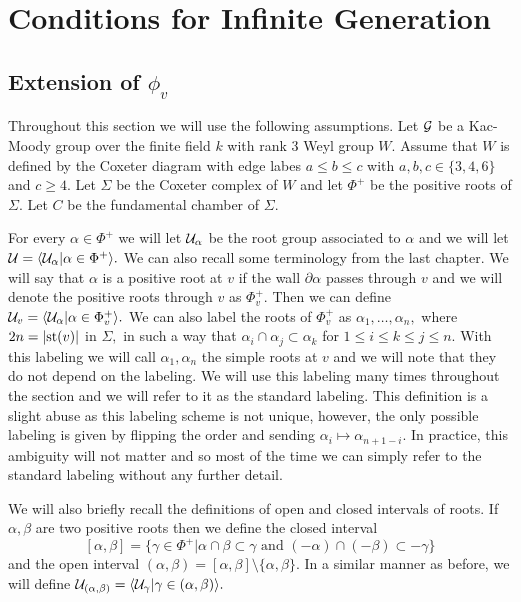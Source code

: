 \documentclass[class=book, crop=false,12 pt]{standalone}
\begin{document}
\chapter{Conditions for Infinite Generation}
\section{Extension of $\phi_v$}
Throughout this section we will use the following assumptions. Let $\mathcal{G}$ be a Kac-Moody group over the finite field $k$ with rank 3 Weyl group $W.$ Assume that $W$ is defined by the Coxeter diagram with edge labes $a\le b\le c$ with $a,b,c\in \{3,4,6\}$ and $c\ge 4.$ Let $\Sigma$ be the Coxeter complex of $W$ and let $\Phi^+$ be the positive roots of $\Sigma.$ Let $C$ be the fundamental chamber of $\Sigma.$

For every $\alpha\in \Phi^+$ we will let $\mathcal{U}_\alpha$ be the root group associated to $\alpha$ and we will let $\mathcal{U}=\langle\mathcal{U}_\alpha|\alpha\in \Phi^+\rangle.$ We can also recall some terminology from the last chapter. We will say that $\alpha$ is a positive root at $v$ if the wall $\partial\alpha$ passes through $v$ and we will denote the positive roots through $v$ as $\Phi_v^+.$ Then we can define $\mathcal{U}_v=\langle \mathcal{U}_\alpha|\alpha\in \Phi_v^+\rangle.$ We can also label the roots of $\Phi_v^+$ as $\alpha_1,\dots,\alpha_n,$ where $2n=|\mathrm{st}(v)|$ in $\Sigma,$ in such a way that $\alpha_i\cap \alpha_j\subset \alpha_k$ for $1\le i\le k\le j\le n.$ With this labeling we will call $\alpha_1,\alpha_n$ the simple roots at $v$ and we will note that they do not depend on the labeling. We will use this labeling many times throughout the section and we will refer to it as the standard labeling. This definition is a slight abuse as this labeling scheme is not unique, however, the only possible labeling is given by flipping the order and sending $\alpha_i\mapsto \alpha_{n+1-i}.$ In practice, this ambiguity will not matter and so most of the time we can simply refer to the standard labeling without any further detail.

We will also briefly recall the definitions of open and closed intervals of roots. If $\alpha,\beta$ are two positive roots then we define the closed interval
\[
	[\alpha,\beta]=\{\gamma\in \Phi^+|\alpha\cap\beta\subset \gamma\text{ and }(-\alpha)\cap (-\beta)\subset -\gamma\}
\]
and the open interval $(\alpha,\beta)=[\alpha,\beta]\setminus\{\alpha,\beta\}.$ In a similar manner as before, we will define $\mathcal{U}_{(\alpha,\beta)}=\langle \mathcal{U}_\gamma|\gamma\in (\alpha,\beta)\rangle.$
\end{document}
